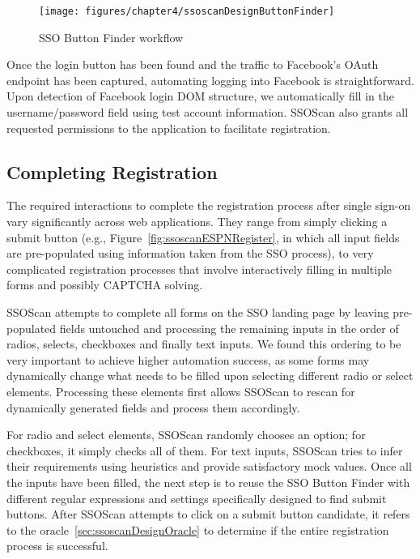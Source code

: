 \begin{figure}[hbt]
\centering
\texttt{[image: figures/chapter4/ssoscanDesignButtonFinder]}
\caption{SSO Button Finder workflow}
\label{fig:ssoscanDesignButtonFinder}
\end{figure}

Once the login button has been found and the traffic to Facebook's OAuth endpoint has been captured, automating logging into Facebook is straightforward.  Upon detection of Facebook login DOM structure, we automatically fill in the username/password field using test account information.  SSOScan also grants all requested permissions to the application to facilitate registration.

\subsection{Completing Registration}
\label{sec:ssoscanDesignCR}

The required interactions to complete the registration process after single sign-on vary significantly across web applications.  They range from simply clicking a submit button (e.g., Figure~\ref{fig:ssoscanESPNRegister}, in which all input fields are pre-populated using information taken from the SSO process), to very complicated registration processes that involve interactively filling in multiple forms and possibly CAPTCHA solving.

SSOScan attempts to complete all forms on the SSO landing page by leaving pre-populated fields untouched and processing the remaining inputs in the order of radios, selects, checkboxes and finally text inputs.  We found this ordering to be very important to achieve higher automation success, as some forms may dynamically change what needs to be filled upon selecting different radio or select elements.  Processing these elements first allows SSOScan to rescan for dynamically generated fields and process them accordingly.  

For radio and select elements, SSOScan randomly chooses an option; for checkboxes, it simply checks all of them.  For text inputs, SSOScan tries to infer their requirements using heuristics and provide satisfactory mock values.  Once all the inputs have been filled, the next step is to reuse the SSO Button Finder with different regular expressions and settings specifically designed to find submit buttons.  After SSOScan attempts to click on a submit button candidate, it refers to the oracle~\ref{sec:ssoscanDesignOracle} to determine if the entire registration process is successful.

